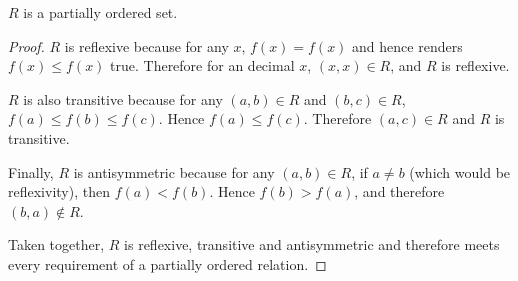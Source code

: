 
\begin{theorem}
  $R$ is a partially ordered set.
\end{theorem}

\begin{proof}
  $R$ is reflexive because for any $x$, $f(x) = f(x)$ and hence renders $f(x)
  \le f(x)$ true. Therefore for an decimal $x$, $(x,x) \in R$, and $R$ is
  reflexive.

  $R$ is also transitive because for any $(a,b)\in R$ and $(b,c) \in R$, $f(a)
  \le f(b) \le f(c)$. Hence $f(a) \le f(c)$. Therefore $(a,c) \in R$ and $R$ is
  transitive.

  Finally, $R$ is antisymmetric because for any $(a,b)\in R$, if $a \ne b$
  (which would be reflexivity), then $f(a) < f(b)$. Hence $f(b) > f(a)$, and
  therefore $(b,a) \notin R$.

  Taken together, $R$ is reflexive, transitive and antisymmetric and therefore
  meets every requirement of a partially ordered relation.
\end{proof}

